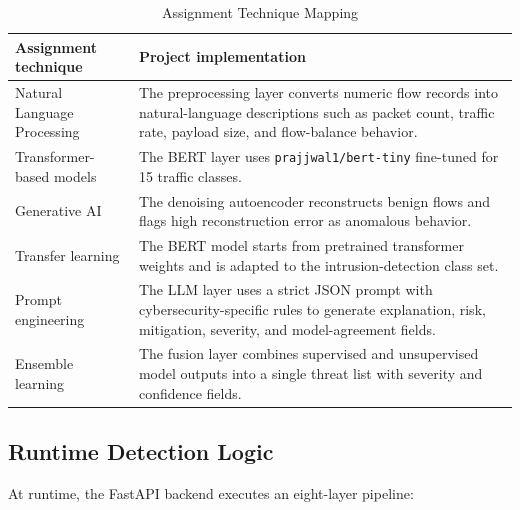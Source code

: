 \documentclass[12pt,a4paper]{article}
\begin{document}
\begin{table}[H]
\centering
\caption{Assignment Technique Mapping}
\label{tab:technique_mapping}
\begin{tabularx}{\linewidth}{l X}
\toprule
Assignment technique & Project implementation \\
\midrule
Natural Language Processing & The preprocessing layer converts numeric flow records into natural-language descriptions such as packet count, traffic rate, payload size, and flow-balance behavior. \\
Transformer-based models & The BERT layer uses \texttt{prajjwal1/bert-tiny} fine-tuned for 15 traffic classes. \\
Generative AI & The denoising autoencoder reconstructs benign flows and flags high reconstruction error as anomalous behavior. \\
Transfer learning & The BERT model starts from pretrained transformer weights and is adapted to the intrusion-detection class set. \\
Prompt engineering & The LLM layer uses a strict JSON prompt with cybersecurity-specific rules to generate explanation, risk, mitigation, severity, and model-agreement fields. \\
Ensemble learning & The fusion layer combines supervised and unsupervised model outputs into a single threat list with severity and confidence fields. \\
\bottomrule
\end{tabularx}
\end{table}

\subsection{Runtime Detection Logic}

At runtime, the FastAPI backend executes an eight-layer pipeline:
\end{document}
